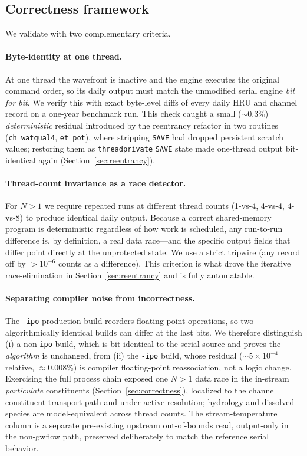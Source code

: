 \subsection{Correctness framework}\label{sec:validation}
We validate with two complementary criteria.

\paragraph{Byte-identity at one thread.} At one thread the wavefront is inactive and the
engine executes the original command order, so its daily output must match the unmodified
serial engine \emph{bit for bit}. We verify this with exact byte-level diffs of every
daily HRU and channel record on a one-year benchmark run. This check caught a small
($\sim$0.3\%) \emph{deterministic} residual introduced by the reentrancy refactor in two
routines (\texttt{ch\_watqual4}, \texttt{et\_pot}), where stripping \texttt{SAVE} had dropped
persistent scratch values; restoring them as \texttt{threadprivate} \texttt{SAVE} state made
one-thread output bit-identical again (Section~\ref{sec:reentrancy}).

\paragraph{Thread-count invariance as a race detector.} For $N>1$ we require repeated runs at
different thread counts (1-vs-4, 4-vs-4, 4-vs-8) to produce identical daily output. Because a
correct shared-memory program is deterministic regardless of how work is scheduled, any
run-to-run difference is, by definition, a real data race---and the specific output fields
that differ point directly at the unprotected state. We use a strict tripwire (any record off
by $>10^{-6}$ counts as a difference). This criterion is what drove the iterative
race-elimination in Section~\ref{sec:reentrancy} and is fully automatable.

\paragraph{Separating compiler noise from incorrectness.} The \texttt{-ipo} production build
reorders floating-point operations, so two algorithmically identical builds can differ at the
last bits. We therefore distinguish (i) a non-\texttt{ipo} build, which is bit-identical to
the serial source and proves the \emph{algorithm} is unchanged, from (ii) the \texttt{-ipo}
build, whose residual ($\sim$$5\times10^{-4}$ relative, $\approx$0.008\%) is compiler
floating-point reassociation, not a logic change. Exercising the full process chain exposed one
$N>1$ data race in the in-stream \emph{particulate} constituents (Section~\ref{sec:correctness}),
localized to the channel constituent-transport path and under active resolution; hydrology and
dissolved species are model-equivalent across thread counts. The stream-temperature column is a
separate pre-existing upstream out-of-bounds read, output-only in the non-gwflow path, preserved
deliberately to match the reference serial behavior.
